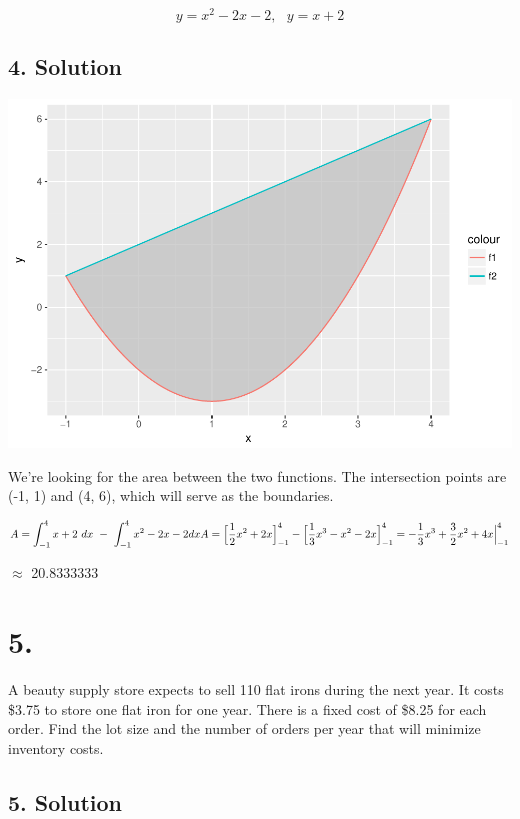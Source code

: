 \documentclass[]{article}
\begin{document}
\[
y = x^2 -2x -2, \ \ \ y = x + 2
\]

\subsection{4. Solution}\label{solution-3}

\includegraphics{JSturm_Assignment_13_files/figure-latex/fourgraph-1.pdf}

We're looking for the area between the two functions. The intersection
points are (-1, 1) and (4, 6), which will serve as the boundaries.

\[
A = \int_{-1}^{4} x + 2 \ dx  \ - \ \int_{-1}^{4}x^2 - 2x - 2 dx \\
A = \Big[\frac{1}{2}x^2 + 2x\Big]_{-1}^{4} - \Big[\frac{1}{3}x^3 - x^2 - 2x\Big]_{-1}^{4} \\
= -\frac{1}{3}x^3 + \frac{3}{2}x^2 + 4x\Big|_{-1}^{4} \\
\]

\(\approx\) 20.8333333

\section{5.}\label{section-4}

A beauty supply store expects to sell 110 flat irons during the next
year. It costs \$3.75 to store one flat iron for one year. There is a
fixed cost of \$8.25 for each order. Find the lot size and the number of
orders per year that will minimize inventory costs.

\subsection{5. Solution}\label{solution-4}
\end{document}
